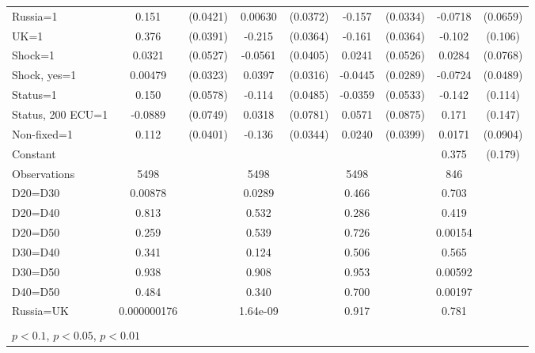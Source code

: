 \begin{tabular}{l|cccccc|cc}
Russia=1        &    0.151\sym{***}& (0.0421)&  0.00630         & (0.0372)&   -0.157\sym{***}& (0.0334)&  -0.0718         & (0.0659)\\
UK=1            &    0.376\sym{***}& (0.0391)&   -0.215\sym{***}& (0.0364)&   -0.161\sym{***}& (0.0364)&   -0.102         &  (0.106)\\
Shock=1         &   0.0321         & (0.0527)&  -0.0561         & (0.0405)&   0.0241         & (0.0526)&   0.0284         & (0.0768)\\
Shock, yes=1    &  0.00479         & (0.0323)&   0.0397         & (0.0316)&  -0.0445         & (0.0289)&  -0.0724         & (0.0489)\\
Status=1        &    0.150\sym{***}& (0.0578)&   -0.114\sym{**} & (0.0485)&  -0.0359         & (0.0533)&   -0.142         &  (0.114)\\
Status, 200 ECU=1&  -0.0889         & (0.0749)&   0.0318         & (0.0781)&   0.0571         & (0.0875)&    0.171         &  (0.147)\\
Non-fixed=1     &    0.112\sym{***}& (0.0401)&   -0.136\sym{***}& (0.0344)&   0.0240         & (0.0399)&   0.0171         & (0.0904)\\
Constant        &                  &         &                  &         &                  &         &    0.375\sym{**} &  (0.179)\\
\hline
Observations    &     5498         &         &     5498         &         &     5498         &         &      846         &         \\
D20=D30         &  0.00878         &         &   0.0289         &         &    0.466         &         &    0.703         &         \\
D20=D40         &    0.813         &         &    0.532         &         &    0.286         &         &    0.419         &         \\
D20=D50         &    0.259         &         &    0.539         &         &    0.726         &         &  0.00154         &         \\
D30=D40         &    0.341         &         &    0.124         &         &    0.506         &         &    0.565         &         \\
D30=D50         &    0.938         &         &    0.908         &         &    0.953         &         &  0.00592         &         \\
D40=D50         &    0.484         &         &    0.340         &         &    0.700         &         &  0.00197         &         \\
Russia=UK       &0.000000176         &         & 1.64e-09         &         &    0.917         &         &    0.781         &         \\
\hline\hline
\multicolumn{9}{p{16cm}}{\tiny }\\
\multicolumn{9}{l}{\tiny \sym{*} \(p<0.1\), \sym{**} \(p<0.05\), \sym{***} \(p<0.01\)}\\
\end{tabular}